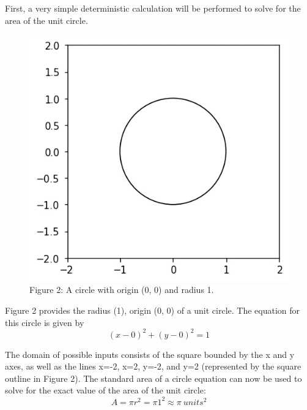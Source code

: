 \documentclass[11pt]{article}
\begin{document}
First, a very simple deterministic calculation will be performed to solve for the area of the unit circle.
\begin{figure}[h]
\includegraphics[scale=.2]{circle_clear}
\centering\\
\footnotesize\centering Figure 2: A circle with origin (0, 0) and radius 1. 
\end{figure}

Figure 2 provides the radius (1), origin (0, 0) of a unit circle. The equation for this circle is given by\\[-10ex]

\[(x-0)^2+(y-0)^2=1\]

The domain of possible inputs consists of the square bounded by the x and y axes, as well as the lines x=-2, x=2, y=-2, and y=2 (represented by the square outline in Figure 2). The standard area of a circle equation can now be used to solve for the exact value of the area of the unit circle:\\[-7ex]

\[A=\pi r^2=\pi 1^2 \approx \boxed{\pi \ units^2}\]
\end{document}
